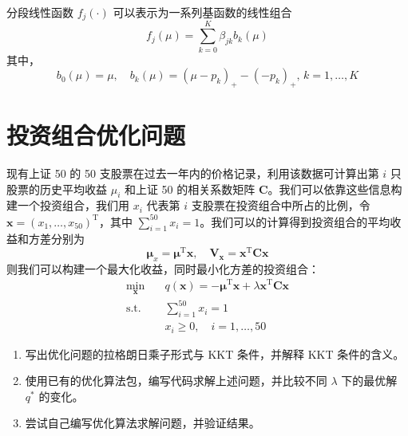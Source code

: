 \documentclass[cn,12pt,mtpro2]{elegantpaper}
\begin{document}
\begin{note}
    分段线性函数 $f_{j}(\cdot)$ 可以表示为一系列基函数的线性组合
    \begin{equation}
        f_{j}(\mu)=\sum_{k=0}^{K}\beta_{jk}b_{k}(\mu)
    \end{equation}
    其中，
    \begin{equation}
        b_{0}(\mu)=\mu,\quad b_{k}(\mu)=(\mu-p_{k})_{+}-(-p_{k})_{+},\,k=1,\ldots,K
    \end{equation}
\end{note}

\section{投资组合优化问题}

现有上证 50 的 50 支股票在过去一年内的价格记录，利用该数据可计算出第 $i$ 只股票的历史平均收益 $\mu_{i}$ 和上证 50 的相关系数矩阵 $\mathbf{C}$。我们可以依靠这些信息构建一个投资组合，我们用 $x_{i}$ 代表第 $i$ 支股票在投资组合中所占的比例，令 $\mathbf{x}=
    \left(x_{1},\ldots,x_{50}\right)^{\mathrm{T}}$，其中 $\sum_{i=1}^{50}x_{i}=1$。我们可以的计算得到投资组合的平均收益和方差分别为
\begin{equation}
    \mathbf{\mu}_{x}=\mathbf{\mu}^{\mathrm{T}}\mathbf{x},\quad\mathbf{V}_{\mathbf{x}}=\mathbf{x}^{\mathrm{T}}\mathbf{C}\mathbf{x}
\end{equation}
则我们可以构建一个最大化收益，同时最小化方差的投资组合：
\begin{equation}
    \begin{aligned}
        \min_{\mathbf{x}}\quad & q(\mathbf{x})=-\mathbf{\mu}^{\mathrm{T}}\mathbf{x}+\lambda\mathbf{x}^{\mathrm{T}}\mathbf{C}\mathbf{x} \\
        \textrm{s.t.}\quad     & \sum_{i=1}^{50}x_i=1                                                                                  \\
                               & x_{i}\geq 0,\quad i=1,\ldots,50
    \end{aligned}
\end{equation}
\begin{enumerate}
    \item 写出优化问题的拉格朗日乘子形式与 KKT 条件，并解释 KKT 条件的含义。
    \item 使用已有的优化算法包，编写代码求解上述问题，并比较不同 $\lambda$ 下的最优解 $q^{*}$ 的变化。
    \item 尝试自己编写优化算法求解问题，并验证结果。
\end{enumerate}
\end{document}
